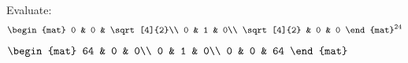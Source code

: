 
\begin{Exercise}[
name={},
title={}, 
difficulty=0,
origin={\cite{BS}}]
Evaluate:
\[
\begin{mat}
0 & 0 & \sqrt[4]{2}\\
0 & 1 & 0\\
\sqrt[4]{2} & 0 & 0
\end{mat}^{24}
\]
\end{Exercise}

\begin{Answer}
$\begin{mat}
64 & 0 & 0\\
0 & 1 & 0\\
0 & 0 & 64
\end{mat}$
\end{Answer}
